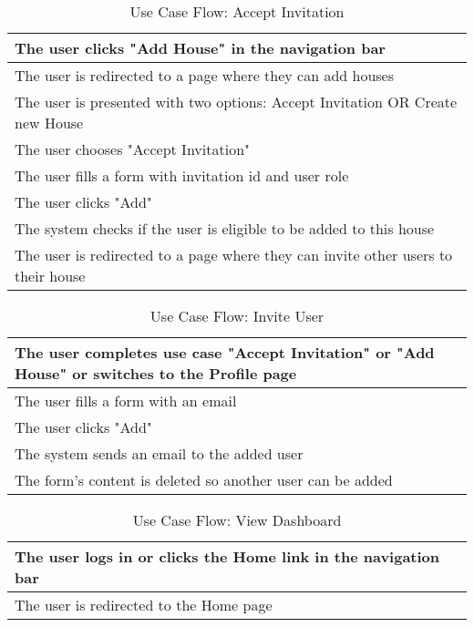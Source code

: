 \begin{table}[H]
  \begin{tabularx}{\linewidth}{|X|}
    \hline
     The user clicks "Add House" in the navigation bar \\
     \hline
     The user is redirected to a page where they can add houses \\
     \hline
     The user is presented with two options: Accept Invitation OR Create new House \\
     \hline 
     The user chooses "Accept Invitation" \\
     \hline 
     The user fills a form with invitation id and user role \\
     \hline
     The user clicks "Add" \\
     \hline  
     The system checks if the user is eligible to be added to this house \\
     \hline  
     The user is redirected to a page where they can invite other users to their house \\
     \hline  
  \end{tabularx}
  \caption{Use Case Flow: Accept Invitation}
\end{table}

\begin{table}[H]
  \begin{tabularx}{\linewidth}{|X|}
    \hline
     The user completes use case "Accept Invitation" or "Add House" or switches to the Profile page \\
     \hline
     The user fills a form with an email \\
     \hline
     The user clicks "Add" \\
     \hline 
     The system sends an email to the added user \\
     \hline
     The form's content is deleted so another user can be added \\
     \hline  
  \end{tabularx}
  \caption{Use Case Flow: Invite User}
\end{table}


\begin{table}[H]
  \begin{tabularx}{\linewidth}{|X|}
    \hline
     The user logs in or clicks the Home link in the navigation bar \\
     \hline
     The user is redirected to the Home page \\
     \hline
  \end{tabularx}
  \caption{Use Case Flow: View Dashboard}
\end{table}